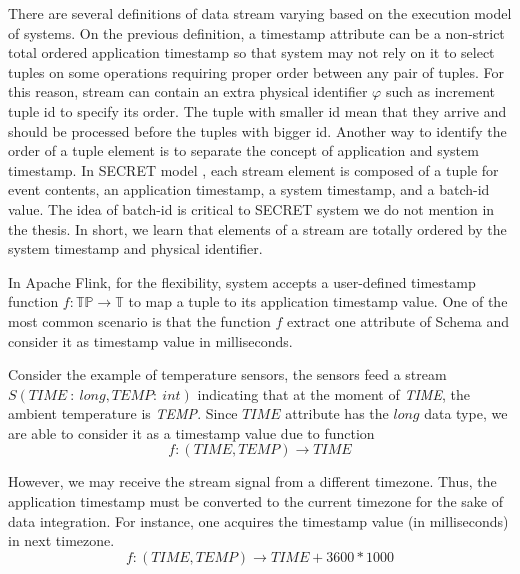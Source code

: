 There are several definitions of data stream varying based on the execution model of systems. On the previous definition, a timestamp attribute can be a non-strict total ordered application timestamp so that system may not rely on it to select tuples on some operations requiring proper order between any pair of tuples. For this reason, stream can contain an extra physical identifier  $\varphi$ \citep{Petit:2010} such as increment tuple id to specify its order. The tuple with smaller id mean that they arrive and should be processed before the tuples with bigger id. Another way to identify the order of a tuple element is to separate the concept of application and system timestamp. In SECRET model \citep{Dindar:2013}, each stream element is composed of a tuple for event contents, an application timestamp, a system timestamp, and a batch-id value. The idea of batch-id is critical to SECRET system we do not mention in the thesis.
In short, we learn that elements of a stream are totally ordered by the system timestamp and physical identifier.

In Apache Flink, for the flexibility, system accepts a user-defined timestamp function   $f: \mathbb{TP} \rightarrow \mathbb{T}$ to map a tuple to its application timestamp value. One of the most common scenario is that the function $f$ extract one attribute of Schema and consider it as timestamp value in milliseconds.

Consider the example of temperature sensors, the sensors feed a stream $S(TIME\ :\ long,TEMP:\ int)$ indicating that at the moment of \textit{TIME}, the ambient temperature is \textit{TEMP}. Since $TIME$ attribute has the $long$ data type, we are able to consider it as a timestamp value due to function
\begin{equation}
f: (TIME, TEMP) \rightarrow TIME
\end{equation}

However, we may receive the stream signal from a different timezone. Thus, the application timestamp must be converted to the current timezone for the sake of data integration. For instance, one acquires the timestamp value (in milliseconds) in next timezone.
\begin{equation}
f: (TIME, TEMP) \rightarrow TIME + 3600*1000
\end{equation}



